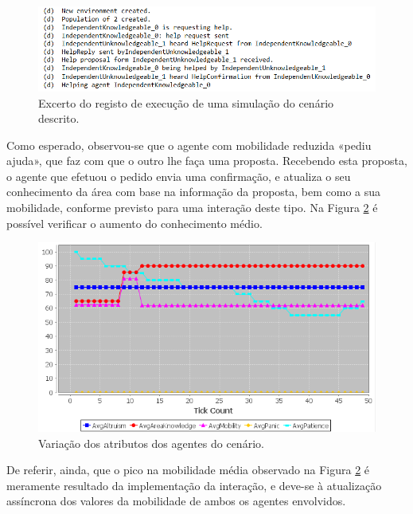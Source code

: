 \documentclass[12pt]{article}
\begin{document}
\begin{titlepage}
\begin{itemize}
\begin{figure}[H]
	\centering
	\includegraphics[scale=.8]{help_log.png}
	\caption{Excerto do registo de execução de uma simulação do cenário descrito.}
	\label{help_log}
\end{figure}

Como esperado, observou-se que o agente com mobilidade reduzida «pediu ajuda», que faz com que o outro lhe faça uma proposta. Recebendo esta proposta, o agente que efetuou o pedido envia uma confirmação, e atualiza o seu conhecimento da área com base na informação da proposta, bem como a sua mobilidade, conforme previsto para uma interação deste tipo. Na Figura \ref{help_graph} é possível verificar o aumento do conhecimento médio.

\begin{figure}[H]
	\centering
	\includegraphics{help_test.png}
	\caption{Variação dos atributos dos agentes do cenário.}
	\label{help_graph}
\end{figure}
	
	De referir, ainda, que o pico na mobilidade média observado na Figura \ref{help_graph} é meramente resultado da implementação da interação, e deve-se à atualização assíncrona dos valores da mobilidade de ambos os agentes envolvidos.
	

\end{itemize}
\end{titlepage}
\end{document}
